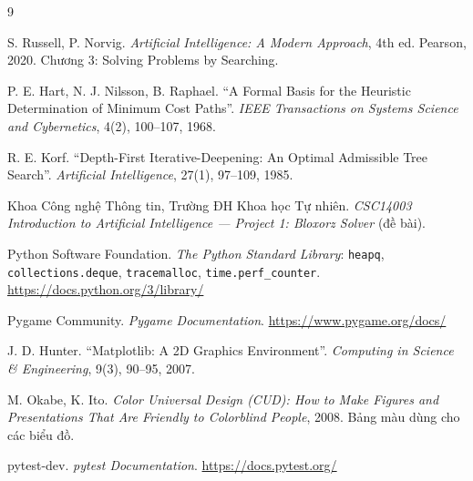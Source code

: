 \renewcommand{\refname}{Tài liệu tham khảo}
\begin{thebibliography}{9}

S. Russell, P. Norvig. \emph{Artificial Intelligence: A Modern Approach}, 4th ed. Pearson, 2020. Chương 3: Solving Problems by Searching.

P. E. Hart, N. J. Nilsson, B. Raphael. ``A Formal Basis for the Heuristic Determination of Minimum Cost Paths''. \emph{IEEE Transactions on Systems Science and Cybernetics}, 4(2), 100--107, 1968.

R. E. Korf. ``Depth-First Iterative-Deepening: An Optimal Admissible Tree Search''. \emph{Artificial Intelligence}, 27(1), 97--109, 1985.

Khoa Công nghệ Thông tin, Trường ĐH Khoa học Tự nhiên. \emph{CSC14003 Introduction to Artificial Intelligence --- Project 1: Bloxorz Solver} (đề bài).

Python Software Foundation. \emph{The Python Standard Library}: \texttt{heapq}, \texttt{collections.deque}, \texttt{tracemalloc}, \texttt{time.perf\_counter}. \url{https://docs.python.org/3/library/}

Pygame Community. \emph{Pygame Documentation}. \url{https://www.pygame.org/docs/}

J. D. Hunter. ``Matplotlib: A 2D Graphics Environment''. \emph{Computing in Science \& Engineering}, 9(3), 90--95, 2007.

M. Okabe, K. Ito. \emph{Color Universal Design (CUD): How to Make Figures and Presentations That Are Friendly to Colorblind People}, 2008. Bảng màu dùng cho các biểu đồ.

pytest-dev. \emph{pytest Documentation}. \url{https://docs.pytest.org/}

\end{thebibliography}
